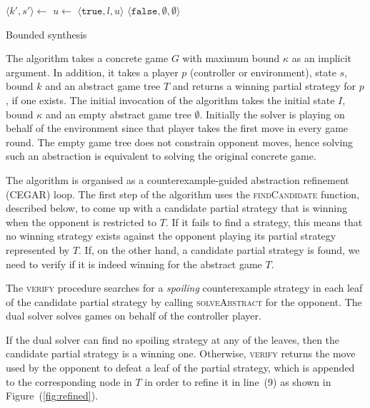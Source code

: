 \documentclass{llncs}
\newcommand{\True}{\texttt{true}}
\newcommand{\False}{\texttt{false}}
\begin{document}
\begin{algorithm}[t]
    \begin{algorithmic}
            \State $\langle k', s'\rangle \gets $  
                \State $u \gets $  
                 \Return $\langle \True, l, u \rangle$ \EndIIf {}
            \EndFor
            \State \Return $\langle \False, \emptyset, \emptyset \rangle$
        \EndFunction
    \end{algorithmic}

    \caption{Bounded synthesis}
    \label{alg:bounded}
\end{algorithm}

The algorithm takes a concrete game $G$ with maximum bound $\kappa$ as an implicit
argument.  In addition, it takes a player $p$ (controller or environment),
state $s$, bound $k$ and an abstract game tree $T$ and returns a winning
partial strategy for $p$, if one exists.  The initial invocation of the
algorithm takes the initial state $I$, bound $\kappa$ and an empty abstract
game tree $\emptyset$.  Initially the solver is playing on behalf of the
environment since that player takes the first move in every game round.  The
empty game tree does not constrain opponent moves, hence solving such an
abstraction is equivalent to solving the original concrete game.

The algorithm is organised as a counterexample-guided abstraction refinement
(CEGAR) loop.  The first step of the algorithm uses the \textsc{findCandidate}
function, described below, to come up with a candidate partial strategy that is
winning when the opponent is restricted to $T$.  If it fails to find a
strategy, this means that no winning strategy exists against the opponent
playing its partial strategy represented by $T$.  If, on the other hand, a
candidate partial strategy is found, we need to verify if it is indeed winning
for the abstract game $T$.

The \textsc{verify} procedure searches for a \emph{spoiling} counterexample
strategy in each leaf of the candidate partial strategy by calling
\textsc{solveAbstract} for the opponent. The dual solver solves games on behalf
of the controller player.  

If the dual solver can find no spoiling strategy at any of the leaves, then the
candidate partial strategy is a winning one. Otherwise, \textsc{verify} returns
the move used by the opponent to defeat a leaf of the partial strategy, which
is appended to the corresponding node in $T$ in order to refine it in line~(9)
as shown in Figure~(\ref{fig:refined}).
\end{document}
